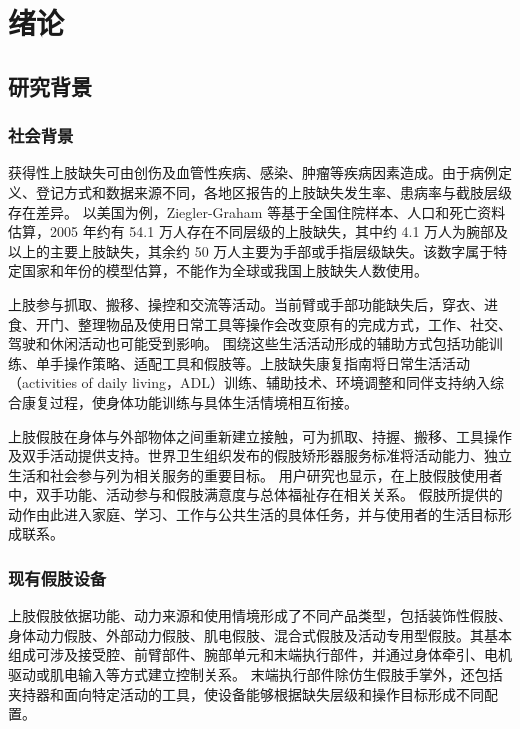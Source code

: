 \chapter{绪论}

\section{研究背景}

\subsection{社会背景}

获得性上肢缺失可由创伤及血管性疾病、感染、肿瘤等疾病因素造成。由于病例定义、登记方式和数据来源不同，各地区报告的上肢缺失发生率、患病率与截肢层级存在差异。\cite{Choi2025UpperLimbEpidemiology} 以美国为例，Ziegler-Graham 等基于全国住院样本、人口和死亡资料估算，2005 年约有 54.1 万人存在不同层级的上肢缺失，其中约 4.1 万人为腕部及以上的主要上肢缺失，其余约 50 万人主要为手部或手指层级缺失。该数字属于特定国家和年份的模型估算，不能作为全球或我国上肢缺失人数使用。\cite{ZieglerGraham2008USLimbLoss,Choi2025UpperLimbEpidemiology}

上肢参与抓取、搬移、操控和交流等活动。当前臂或手部功能缺失后，穿衣、进食、开门、整理物品及使用日常工具等操作会改变原有的完成方式，工作、社交、驾驶和休闲活动也可能受到影响。\cite{Hutchison2024CommunityReintegration,Stevens2023UpperLimbWellbeing} 围绕这些生活活动形成的辅助方式包括功能训练、单手操作策略、适配工具和假肢等。上肢缺失康复指南将日常生活活动（activities of daily living，ADL）训练、辅助技术、环境调整和同伴支持纳入综合康复过程，使身体功能训练与具体生活情境相互衔接。\cite{VADoD2022UpperLimbRehabilitation}

上肢假肢在身体与外部物体之间重新建立接触，可为抓取、持握、搬移、工具操作及双手活动提供支持。世界卫生组织发布的假肢矫形器服务标准将活动能力、独立生活和社会参与列为相关服务的重要目标。\cite{WHO2017ProstheticsOrthoticsStandards} 用户研究也显示，在上肢假肢使用者中，双手功能、活动参与和假肢满意度与总体福祉存在相关关系。\cite{Stevens2023UpperLimbWellbeing} 假肢所提供的动作由此进入家庭、学习、工作与公共生活的具体任务，并与使用者的生活目标形成联系。

\subsection{现有假肢设备}

上肢假肢依据功能、动力来源和使用情境形成了不同产品类型，包括装饰性假肢、身体动力假肢、外部动力假肢、肌电假肢、混合式假肢及活动专用型假肢。其基本组成可涉及接受腔、前臂部件、腕部单元和末端执行部件，并通过身体牵引、电机驱动或肌电输入等方式建立控制关系。\cite{Fink2023UpperExtremityProstheses} 末端执行部件除仿生假肢手掌外，还包括夹持器和面向特定活动的工具，使设备能够根据缺失层级和操作目标形成不同配置。

